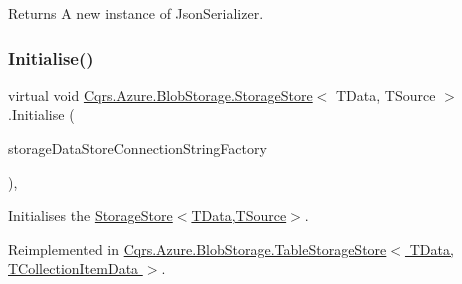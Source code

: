 \begin{DoxyReturn}{Returns}
A new instance of Json\+Serializer.
\end{DoxyReturn}
\mbox{\label{classCqrs_1_1Azure_1_1BlobStorage_1_1StorageStore_a8d16603267a768190f2c49ca3d1c439e_a8d16603267a768190f2c49ca3d1c439e}} 
\subsubsection{\texorpdfstring{Initialise()}{Initialise()}}
{\footnotesize\ttfamily virtual void \hyperlink{classCqrs_1_1Azure_1_1BlobStorage_1_1StorageStore}{Cqrs.\+Azure.\+Blob\+Storage.\+Storage\+Store}$<$ T\+Data, T\+Source $>$.Initialise (\begin{DoxyParamCaption}\item[{\hyperlink{interfaceCqrs_1_1Azure_1_1BlobStorage_1_1IStorageStoreConnectionStringFactory}{I\+Storage\+Store\+Connection\+String\+Factory}}]{storage\+Data\+Store\+Connection\+String\+Factory }\end{DoxyParamCaption})\hspace{0.3cm}{\ttfamily [protected]}, {\ttfamily [virtual]}}



Initialises the \hyperlink{classCqrs_1_1Azure_1_1BlobStorage_1_1StorageStore_ae7a725cdcb7de73e097b02c19463bae7_ae7a725cdcb7de73e097b02c19463bae7}{Storage\+Store$<$\+T\+Data,\+T\+Source$>$}. 



Reimplemented in \hyperlink{classCqrs_1_1Azure_1_1BlobStorage_1_1TableStorageStore_ae775f039a168cc48c731314c7e494bb6_ae775f039a168cc48c731314c7e494bb6}{Cqrs.\+Azure.\+Blob\+Storage.\+Table\+Storage\+Store$<$ T\+Data, T\+Collection\+Item\+Data $>$}.

\mbox{\label{classCqrs_1_1Azure_1_1BlobStorage_1_1StorageStore_a4e848f342be903293812b3b660464d1a_a4e848f342be903293812b3b660464d1a}} 
